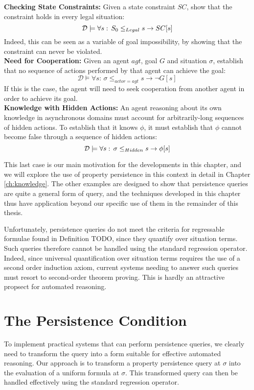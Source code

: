 \textbf{Checking State Constraints:} Given a state constraint $SC$,
show that the constraint holds in every legal situation:\[
\mathcal{D}\models\forall s:\, S_{0}\leq_{Legal}s\rightarrow SC[s]\]
 Indeed, this can be seen as a variable of goal impossibility, by
showing that the constraint can never be violated.\\


\textbf{Need for Cooperation:} Given an agent $agt$, goal $G$ and
situation $\sigma$, establish that no sequence of actions performed
by that agent can achieve the goal:\[
\mathcal{D}\models\forall s:\,\sigma\leq_{actor=agt}s\rightarrow\neg G[s]\]
 If this is the case, the agent will need to seek cooperation from
another agent in order to achieve its goal.\\


\textbf{Knowledge with Hidden Actions:} An agent reasoning about its
own knowledge in asynchronous domains must account for arbitrarily-long
sequences of hidden actions. To establish that it knows $\phi$, it
must establish that $\phi$ cannot become false through a sequence
of hidden actions:\[
\mathcal{D}\models\forall s:\,\sigma\leq_{Hidden}s\rightarrow\phi[s]\]


This last case is our main motivation for the developments in this
chapter, and we will explore the use of property persistence in this
context in detail in Chapter \ref{ch:knowledge}. The other examples
are designed to show that persistence queries are quite a general
form of query, and the techniques developed in this chapter thus have
application beyond our specific use of them in the remainder of this
thesis.

Unfortunately, persistence queries do not meet the criteria for regressable
formulae found in Definition TODO, since they quantify over situation
terms. Such queries therefore cannot be handled using the standard
regression operator. Indeed, since universal quantification over situation
terms requires the use of a second order induction axiom, current
systems needing to answer such queries must resort to second-order
theorem proving. This is hardly an attractive propsect for automated
reasoning.


\section{The Persistence Condition\label{sec:Persistence:Condition}}

To implement practical systems that can perform persistence queries,
we clearly need to transform the query into a form suitable for effective
automated reasoning. Our approach is to transform a property persistence
query at $\sigma$ into the evaluation of a uniform formula at $\sigma$.
This transformed query can then be handled effectively using the standard
regression operator.

